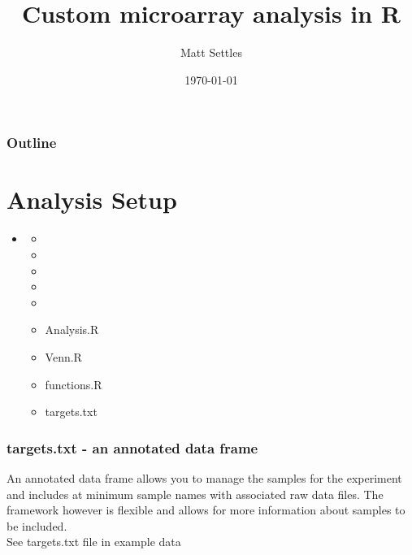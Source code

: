 \documentclass[pdf]{beamer}
\begin{document}
\title[BCB 504-Microarrays]{Custom microarray analysis in R}
\author[Matt Settles]{Matt Settles}
\date{\today}


\begin{frame}[plain]
  \titlepage
\end{frame}


\begin{frame}[plain] 
  \frametitle{Outline}
  \tableofcontents
\end{frame}

\section{Analysis Setup}
\begin{frame}
  \begin{itemize}
    \item {}
    \begin{itemize}
      \item {}
      \item {}
      \item {}
      \item {}
      \item {}
      \item Analysis.R
      \item Venn.R
      \item functions.R
      \item targets.txt
    \end{itemize}
  \end{itemize}
\end{frame}

\begin{frame}
  \frametitle{targets.txt - an annotated data frame}
  An annotated data frame allows you to manage the samples for the experiment and includes at minimum sample names with associated raw data files. The framework however is flexible and allows for more information about samples to be included.\\


 \alert{See targets.txt file in example data} 
\end{frame}
  
\end{document}

